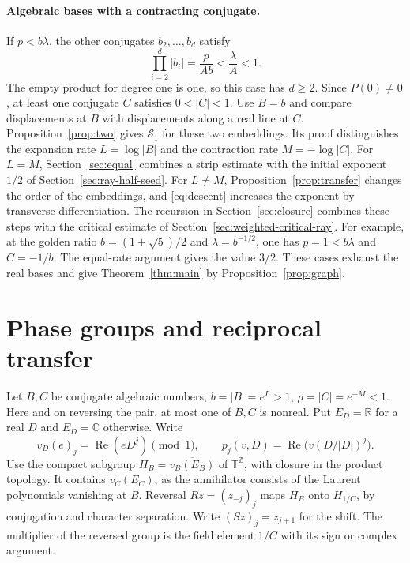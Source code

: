 \documentclass[11pt,a4paper]{article}
\newcommand{\T}{\mathbb T}
\begin{document}
\paragraph{Algebraic bases with a contracting conjugate.}
If $p<b\lambda$, the other conjugates $b_2,\ldots,b_d$ satisfy
\[
 \prod_{i=2}^{d}|b_i|=\frac{p}{Ab}<\frac{\lambda}{A}<1.
\]
The empty product for degree one is one, so this case has $d\ge2$.
Since $P(0)\ne0$, at least one conjugate $C$ satisfies $0<|C|<1$.
Use $B=b$ and compare
displacements at $B$ with displacements along a real line at $C$.
Proposition~\ref{prop:two} gives $\mathcal S_1$ for these two
embeddings. Its proof distinguishes the expansion rate
$L=\log|B|$ and the contraction rate $M=-\log|C|$.
For $L=M$, Section~\ref{sec:equal} combines a strip estimate with
the initial exponent $1/2$ of Section~\ref{sec:ray-half-seed}.
For $L\ne M$, Proposition~\ref{prop:transfer} changes the order
of the embeddings, and \eqref{eq:descent} increases the exponent
by transverse differentiation. The recursion in
Section~\ref{sec:closure} combines these steps with the critical
estimate of Section~\ref{sec:weighted-critical-ray}.
For example, at the golden ratio $b=(1+\sqrt5)/2$ and
$\lambda=b^{-1/2}$, one has $p=1<b\lambda$ and $C=-1/b$.
The equal-rate argument gives the value $3/2$.
These cases exhaust the real bases and give Theorem~\ref{thm:main}
by Proposition~\ref{prop:graph}.

\section{Phase groups and reciprocal transfer}\label{sec:embeddings}
Let $B,C$ be conjugate algebraic numbers, $b=|B|=e^L>1$,
$\rho=|C|=e^{-M}<1$. Here and on reversing the pair, at most one of $B,C$ is
nonreal. Put $E_D=\mathbb R$ for a real $D$ and $E_D=\mathbb C$
otherwise. Write
\[
 v_D(e)_j=\operatorname{Re}(eD^j)\pmod1,\qquad
 p_j(v,D)=\operatorname{Re}\big(v(D/|D|)^j\big).
\]
Use the compact subgroup $H_B=\overline{v_B(E_B)}$ of $\T^{\mathbb Z}$, with closure in the product topology. It contains
$v_C(E_C)$, as the annihilator consists of the Laurent polynomials
vanishing at $B$. Reversal $Rz=(z_{-j})_j$ maps $H_B$ onto
$H_{1/C}$, by conjugation and character separation. Write $(Sz)_j=z_{j+1}$ for the shift. The multiplier of the reversed
group is the field element $1/C$ with its sign or complex argument.
\end{document}
